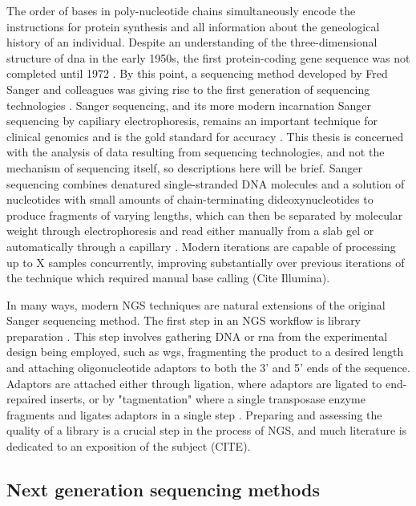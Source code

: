 The order of bases in poly-nucleotide chains simultaneously encode the instructions for protein synthesis and all information about the geneological history of an individual. Despite an understanding of the three-dimensional structure of \gls{dna} in the early 1950s, the first protein-coding gene sequence was not completed until 1972 \cite{JD1953,JOU1972}. By this point, a sequencing method developed by Fred Sanger and colleagues was giving rise to the first generation of sequencing technologies \cite{Kulkarni2014}. Sanger sequencing, and its more modern incarnation Sanger sequencing by capiliary electrophoresis, remains an important technique for clinical genomics and is the gold standard for accuracy \cite{Shendure2017}. This thesis is concerned with the analysis of data resulting from sequencing technologies, and not the mechanism of sequencing itself, so descriptions here will be brief. Sanger sequencing combines denatured single-stranded DNA molecules and a solution of nucleotides with small amounts of chain-terminating dideoxynucleotides to produce fragments of varying lengths, which can then be separated by molecular weight through electrophoresis and read either manually from a slab gel or automatically through a capillary \cite{F1977,Liu2012}. Modern iterations are capable of processing up to X samples concurrently, improving substantially over previous iterations of the technique which required manual base calling (Cite Illumina). 

In many ways, modern NGS techniques are natural extensions of the original Sanger sequencing method. The first step in an NGS workflow is library preparation \cite{Head2018}. This step involves gathering DNA or \gls{rna} from the experimental design being employed, such as \gls{wgs}, fragmenting the product to a desired length and attaching oligonucleotide adaptors to both the 3' and 5' ends of the sequence. Adaptors are attached either through ligation, where adaptors are ligated to end-repaired inserts, or by "tagmentation" where a single transposase enzyme fragments and ligates adaptors in a single step \cite{R2011}. Preparing and assessing the quality of a library is a crucial step in the process of NGS, and much literature is dedicated to an exposition of the subject (CITE). 

\subsection{Next generation sequencing methods} \label{intro:ngs_methods}

